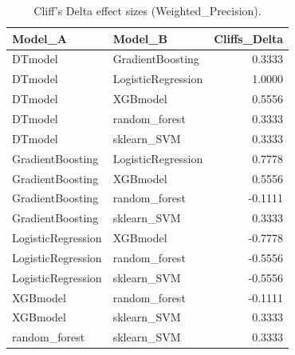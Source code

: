 \begin{table}[t]
\centering
\begin{tabular}{llr}
\toprule
Model_A & Model_B & Cliffs_Delta \\
\midrule
DTmodel & GradientBoosting & 0.3333 \\
DTmodel & LogisticRegression & 1.0000 \\
DTmodel & XGBmodel & 0.5556 \\
DTmodel & random_forest & 0.3333 \\
DTmodel & sklearn_SVM & 0.3333 \\
GradientBoosting & LogisticRegression & 0.7778 \\
GradientBoosting & XGBmodel & 0.5556 \\
GradientBoosting & random_forest & -0.1111 \\
GradientBoosting & sklearn_SVM & 0.3333 \\
LogisticRegression & XGBmodel & -0.7778 \\
LogisticRegression & random_forest & -0.5556 \\
LogisticRegression & sklearn_SVM & -0.5556 \\
XGBmodel & random_forest & -0.1111 \\
XGBmodel & sklearn_SVM & 0.3333 \\
random_forest & sklearn_SVM & 0.3333 \\
\bottomrule
\end{tabular}
\caption{Cliff's Delta effect sizes (Weighted_Precision).}
\label{tab:cliffs_Weighted_Precision}
\end{table}